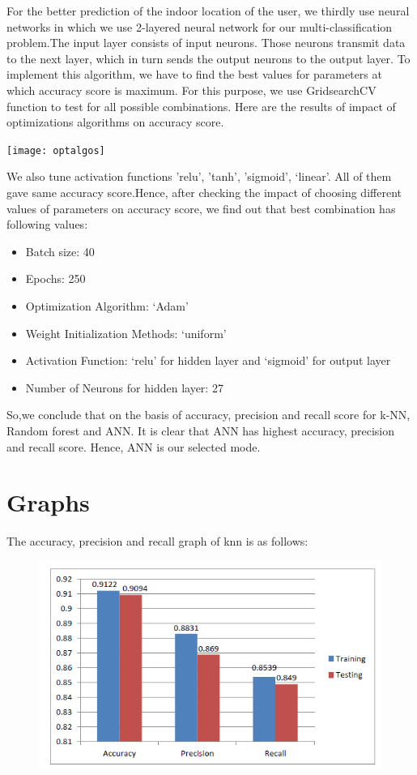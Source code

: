 For the better prediction of the indoor location of the user, we thirdly use neural networks in which we use 2-layered neural network for our multi-classification problem.The input layer consists of input neurons. Those neurons transmit data to the next layer, which in turn sends the output neurons to the output layer. To implement this algorithm, we have to find the best values for parameters at which accuracy score is maximum. For this purpose, we use GridsearchCV function to test for all possible combinations. Here are the results of impact of optimizations algorithms on accuracy score.
\begin{center}
\texttt{[image: optalgos]}
\end{center}

We also tune activation functions { 'relu', 'tanh', 'sigmoid', ‘linear’}. All of them gave same accuracy score.Hence, after checking the impact of choosing different values of parameters on accuracy score, we find out that best combination has following values:
\begin{itemize}
\item Batch size: 40
\item Epochs: 250
\item Optimization Algorithm: ‘Adam’
\item Weight Initialization Methods: ‘uniform’
\item Activation Function: ‘relu’ for hidden layer and ‘sigmoid’ for output layer
\item Number of Neurons for hidden layer: 27
\end{itemize}
So,we conclude that on the basis of accuracy, precision and recall score for k-NN, Random forest and ANN. It is clear that ANN has highest accuracy, precision and recall score. Hence, ANN is our selected mode.
\pagebreak

\section{Graphs}

The  accuracy, precision and recall graph of knn is as follows:
\begin{figure}[h]
  		\centering
    		\includegraphics[scale=0.85]{./Figures/knncmgraph}
 		\end{figure}


